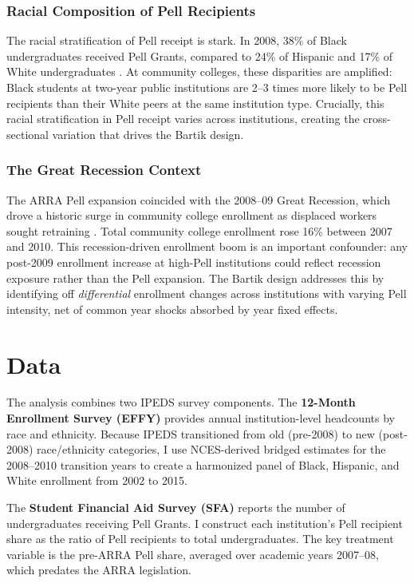 \documentclass[12pt]{article}
\begin{document}
\subsubsection*{Racial Composition of Pell Recipients} The racial stratification of Pell receipt is stark. In 2008, 38\% of Black undergraduates received Pell Grants, compared to 24\% of Hispanic and 17\% of White undergraduates \citep{baum2010pell}. At community colleges, these disparities are amplified: Black students at two-year public institutions are 2--3 times more likely to be Pell recipients than their White peers at the same institution type. Crucially, this racial stratification in Pell receipt varies across institutions, creating the cross-sectional variation that drives the Bartik design.

\subsubsection*{The Great Recession Context} The ARRA Pell expansion coincided with the 2008--09 Great Recession, which drove a historic surge in community college enrollment as displaced workers sought retraining \citep{long2014financial, barr2015credit}. Total community college enrollment rose 16\% between 2007 and 2010. This recession-driven enrollment boom is an important confounder: any post-2009 enrollment increase at high-Pell institutions could reflect recession exposure rather than the Pell expansion. The Bartik design addresses this by identifying off \textit{differential} enrollment changes across institutions with varying Pell intensity, net of common year shocks absorbed by year fixed effects.

\section{Data}

The analysis combines two IPEDS survey components. The \textbf{12-Month Enrollment Survey (EFFY)} provides annual institution-level headcounts by race and ethnicity. Because IPEDS transitioned from old (pre-2008) to new (post-2008) race/ethnicity categories, I use NCES-derived bridged estimates for the 2008--2010 transition years to create a harmonized panel of Black, Hispanic, and White enrollment from 2002 to 2015.

The \textbf{Student Financial Aid Survey (SFA)} reports the number of undergraduates receiving Pell Grants. I construct each institution's Pell recipient share as the ratio of Pell recipients to total undergraduates. The key treatment variable is the pre-ARRA Pell share, averaged over academic years 2007--08, which predates the ARRA legislation.
\end{document}
